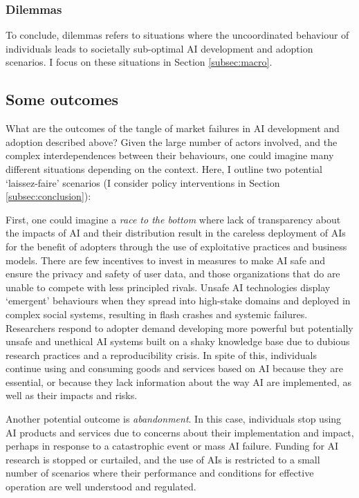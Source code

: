 \documentclass[11pt]{article}
\begin{document}
\subsubsection*{Dilemmas}
To conclude, dilemmas refers to situations where the uncoordinated behaviour of individuals leads to societally sub-optimal AI development and adoption scenarios. I focus on these situations in Section \ref{subsec:macro}.

\subsection{Some outcomes}
\label{subsec:outcomes}
What are the outcomes of the tangle of market failures in AI development and adoption described above? Given the large number of actors involved, and the complex interdependences between their behaviours, one could imagine many different situations depending on the context. Here, I outline two potential `laissez-faire' scenarios (I consider policy interventions in Section \ref{subsec:conclusion}):

First, one could imagine a \textit{race to the bottom} where lack of transparency about the impacts of AI and their distribution result in the careless deployment of AIs for the benefit of adopters through the use of exploitative practices and business models. There are few incentives to invest in measures to make AI safe and ensure the privacy and safety of user data, and those organizations that do are unable to compete with less principled rivals. Unsafe AI technologies display `emergent' behaviours when they spread into high-stake domains and deployed in complex social systems, resulting in flash crashes and systemic failures. Researchers respond to adopter demand developing more powerful but potentially unsafe and unethical AI systems built on a shaky knowledge base due to dubious research practices and a reproducibility crisis. In spite of this, individuals continue using and consuming goods and services based on AI because they are essential, or because they lack information about the way AI are implemented, as well as their impacts and risks.

Another potential outcome is \textit{abandonment}. In this case, individuals stop using AI products and services due to concerns about their implementation and impact, perhaps in response to a catastrophic event or mass AI failure. Funding for AI research is stopped or curtailed, and the use of AIs is restricted to a small number of scenarios where their performance and conditions for effective operation are well understood and regulated. 
\end{document}
